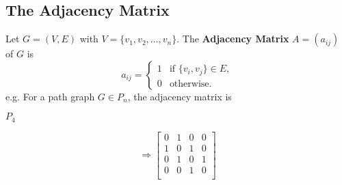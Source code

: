 \documentclass[11pt]{article}
\begin{document}
\subsection{The Adjacency Matrix}
Let $G = (V,E)$ with $V = \{v_1, v_2, \dots, v_n\}$. The \textbf{Adjacency Matrix} $A=(a_{ij})$ of $G$ is
\[
    a_{ij} = 
    \begin{cases}
        1 & \text{if } \{v_i,v_j\}\in E,\\
        0 & \text{otherwise}.
    \end{cases}
\]
e.g. For a path graph $G \in P_n$, the adjacency matrix is 
\newline
\begin{minipage}{\textwidth}
    \centering
    \begin{minipage}[][70pt][c]{.3\textwidth}
        $P_4\,$ 
        \centering
    \end{minipage}
    \begin{minipage}[m][70pt][c]{.2\textwidth}
    \vfill
    \[
        \Rightarrow
        \begin{bmatrix}
            0 & 1 & 0 & 0\\
            1 & 0 & 1 & 0\\
            0 & 1 & 0 & 1\\
            0 & 0 & 1 & 0\\
        \end{bmatrix}
    \]
    \vfill
    \end{minipage}
\end{minipage}
        
\end{document}
